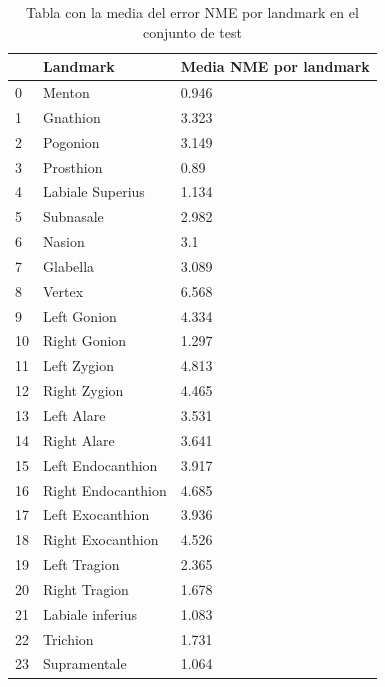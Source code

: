         \begin{table}[!ht]
            \centering
            \caption{Tabla con la media del error NME por landmark en el conjunto de test}
            \begin{tabular}{|l|l|l|}
            \hline
                ~ & \cellcolor{gray!25}\textbf{Landmark} & \cellcolor{gray!25}\textbf{Media NME por landmark} \\ \hline
                0 & Menton & 0.946 \\ \hline
                1 & Gnathion & 3.323 \\ \hline
                2 & Pogonion & 3.149 \\ \hline
                3 & Prosthion & 0.89 \\ \hline
                4 & Labiale Superius & 1.134 \\ \hline
                5 & Subnasale & 2.982 \\ \hline
                6 & Nasion & 3.1 \\ \hline
                7 & Glabella & 3.089 \\ \hline
                8 & Vertex & 6.568 \\ \hline
                9 & Left Gonion & 4.334 \\ \hline
                10 & Right Gonion & 1.297 \\ \hline
                11 & Left Zygion & 4.813 \\ \hline
                12 & Right Zygion & 4.465 \\ \hline
                13 & Left Alare & 3.531 \\ \hline
                14 & Right Alare & 3.641 \\ \hline
                15 & Left Endocanthion & 3.917 \\ \hline
                16 & Right Endocanthion & 4.685 \\ \hline
                17 & Left Exocanthion & 3.936 \\ \hline
                18 & Right Exocanthion & 4.526 \\ \hline
                19 & Left Tragion & 2.365 \\ \hline
                20 & Right Tragion & 1.678 \\ \hline
                21 & Labiale inferius & 1.083 \\ \hline
                22 & Trichion & 1.731 \\ \hline
                23 & Supramentale & 1.064 \\ \hline

\end{tabular}
\end{table}
